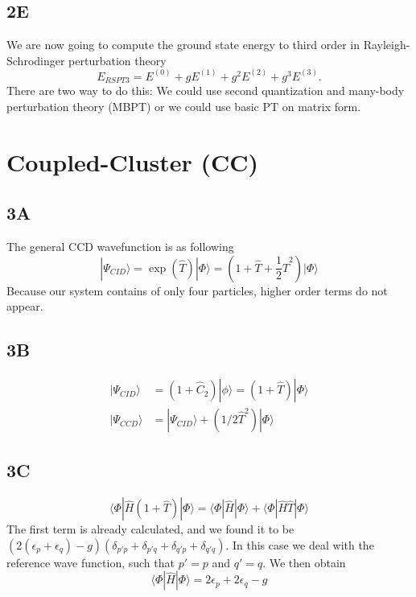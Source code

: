 \documentclass[norsk,a4paper,12pt]{article}
\begin{document}
\subsection*{2E}
We are now going to compute the ground state energy to third order in Rayleigh-Schrodinger perturbation theory
\begin{equation}
E_{RSPT3}=E^{(0)}+gE^{(1)}+g^2E^{(2)}+g^3E^{(3)}.
\end{equation}
There are two way to do this: We could use second quantization and many-body perturbation theory (MBPT) or we could use basic PT on matrix form. 

\section{Coupled-Cluster (CC)}
\subsection*{3A}
The general CCD wavefunction is as following
\begin{equation}
|\Psi_{CID}\rangle=\exp{(\hat{T})}|\Phi\rangle=(1+\hat{T}+\frac{1}{2}\hat{T}^2)|\Phi\rangle
\end{equation}
Because our system contains of only four particles, higher order terms do not appear. 

\subsection*{3B}
\begin{align}
|\Psi_{CID}\rangle&=(1+\hat{C}_2)|\phi\rangle=(1+\hat{T})|\Phi\rangle\\
|\Psi_{CCD}\rangle&=|\Psi_{CID}\rangle+(1/2\hat{T}^2)|\Phi\rangle
\end{align}

\subsection*{3C}
\begin{equation}
\langle \Phi|\hat{H}(1+\hat{T})|\Phi\rangle=\langle \Phi|\hat{H}|\Phi\rangle+\langle \Phi|\hat{H}\hat{T}|\Phi\rangle
\end{equation}
The first term is already calculated, and we found it to be $(2(\epsilon_p+\epsilon_q)-g)(\delta_{p'p}+\delta_{p'q}+\delta_{q'p}+\delta_{q'q})$. In this case we deal with the reference wave function, such that $p'=p$ and $q'=q$. We then obtain
\begin{equation}
\langle \Phi|\hat{H}|\Phi\rangle=2\epsilon_p+2\epsilon_q-g
\end{equation}
\end{document}
